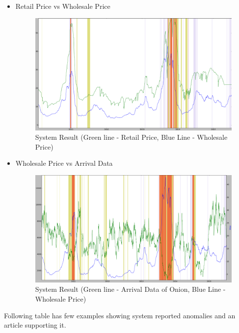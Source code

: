 \documentclass[a4paper,10pt]{article}
\begin{document}
\begin{itemize}
	
 \item Retail Price vs Wholesale Price
			
			\begin{figure}[H]
		    	\centering
  		    	\includegraphics[width=1.1\textwidth]{graphs/retailVsWS_Whole.png}
		    	\caption{System Result (Green line - Retail Price, Blue Line - Wholesale Price)}
		    	\label{fig:RvsW}
			\end{figure}
			
	
 \item Wholesale Price vs Arrival Data
			
			\begin{figure}[H]
		    	\centering
  		    	\includegraphics[width=1.1\textwidth]{graphs/WSvsArrival_Whole.png}
		    	\caption{System Result (Green line - Arrival Data of Onion, Blue Line - Wholesale Price)}
		    	\label{fig:WvsA}
			\end{figure}
			
	
\end{itemize}


Following table has few examples showing system reported anomalies and an article supporting it.
\end{document}
